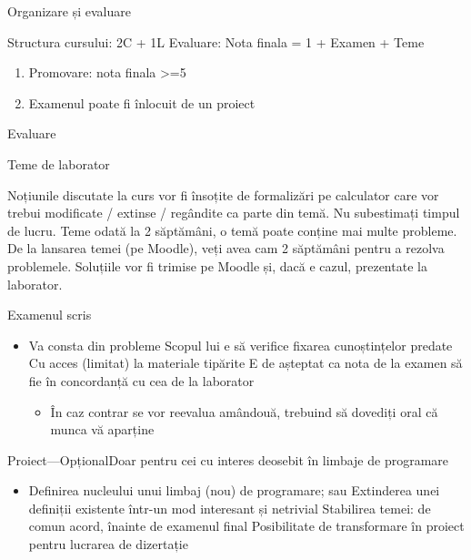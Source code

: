 \documentclass[xcolor=pdftex,romanian,colorlinks]{beamer}
\begin{document}
\begin{frame}{Organizare și evaluare}
\begin{itemize}
\vitem Structura cursului: 2C + 1L
\vitem Evaluare: Nota finala = 1 + Examen + Teme
\vfill
{}
\begin{enumerate}
\item Promovare: nota finala >=5

\item Examenul poate fi înlocuit de un proiect
\end{enumerate}
\end{itemize}
\end{frame}

\begin{section}{Evaluare}
\begin{frame}{Teme de laborator}
\begin{itemize}
\vitem Noțiunile discutate la curs vor fi însoțite de formalizări pe calculator care vor trebui modificate / extinse / regândite ca parte din temă.
\vitem \alert{Nu subestimați timpul de lucru}. Teme odată la 2 săptămâni, o temă poate conține mai multe probleme.
\vitem De la lansarea temei (pe Moodle), veți avea cam 2 săptămâni pentru a rezolva problemele.
\vitem Soluțiile vor fi trimise pe Moodle și, dacă e cazul, prezentate la laborator.
\end{itemize}
\end{frame}

\begin{frame}{Examenul scris}
\begin{itemize}
\item Va consta din probleme
\vitem Scopul lui e să verifice fixarea cunoștințelor predate
\vitem Cu acces (limitat) la materiale tipărite
\vitem E de așteptat ca nota de la examen să fie în concordanță cu cea de la laborator
\begin{itemize}
\item În caz contrar se vor reevalua amândouă, trebuind să dovediți oral că munca vă aparține
\end{itemize}
\end{itemize}
\end{frame}

\begin{frame}{Proiect---Opțional}{Doar pentru cei cu interes deosebit în limbaje de programare}
\begin{itemize}
\item Definirea nucleului unui limbaj (nou) de programare; sau
\vitem Extinderea unei definiții existente într-un mod interesant și netrivial
\vitem Stabilirea temei: de comun acord, 
\vitem {} înainte de examenul final
\vitem Posibilitate de transformare în proiect pentru lucrarea de dizertație
\end{itemize}
\end{frame}


\end{section}
\end{document}
